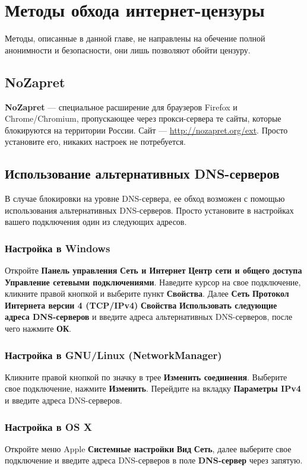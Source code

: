 \chapter{Методы обхода интернет-цензуры}
\begin{important}
Методы, описанные в данной главе, не направлены на обечение полной анонимности и безопасности, они лишь позволяют обойти цензуру.
\end{important}
\section{NoZapret}
\textbf{NoZapret} --- специальное расширение для браузеров Firefox и Chrome/Chromium, пропускающее через прокси-сервера те сайты, которые блокируются на территории России. Сайт --- \url{http://nozapret.org/ext}. Просто установите его, никаких настроек не потребуется.
\section{Использование альтернативных DNS-серверов}
В случае блокировки на уровне DNS-сервера, ее обход возможен с помощью использования альтернативных DNS-серверов. Просто установите в настройках вашего подключения один из следующих адресов.
\subsection{Настройка в Windows}
Откройте \textbf{Панель управления} \textrightarrow \textbf{Сеть и Интернет} \textrightarrow \textbf{Центр сети и общего доступа} \textrightarrow \textbf{Управление сетевыми подключениями}. Наведите курсор на свое подключение, кликните правой кнопкой и выберите пункт \textbf{Свойства}. Далее \textbf{Сеть} \textrightarrow \textbf{Протокол Интернета версии 4 (TCP/IPv4)} \textrightarrow \textbf{Свойства} \textrightarrow \textbf{Использовать следующие адреса DNS-серверов} и введите адреса альтернативных DNS-серверов, после чего нажмите \textbf{ОК}.
\subsection{Настройка в GNU/Linux (NetworkManager)}
Кликните правой кнопкой по значку в трее \textrightarrow \textbf{Изменить соединения}. Выберите свое подключение, нажмите \textbf{Изменить}. Перейдите на вкладку \textbf{Параметры IPv4} и введите адреса DNS-серверов.
\subsection{Настройка в OS X}
Откройте меню Apple \textrightarrow \textbf{Системные настройки} \textrightarrow \textbf{Вид} \textrightarrow \textbf{Сеть}, далее выберите свое подключение и введите адреса DNS-серверов в поле \textbf{DNS-сервер} через запятую.
